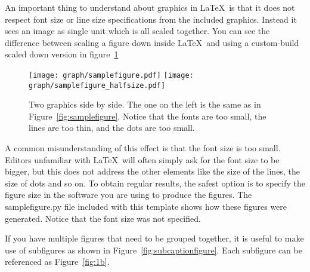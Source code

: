 An important thing to understand about graphics in \LaTeX\ is that it does
not respect font size or line size specifications from the included graphics.
Instead it sees an image as single unit which is all scaled together. You can
see the difference between scaling a figure down inside \LaTeX\ and using a
custom-build scaled down version in figure~\ref{fig:scalingexample}

\begin{figure}[htbp]
  \centering
  \texttt{[image: graph/samplefigure.pdf]}
  \texttt{[image: graph/samplefigure\_halfsize.pdf]}
  \caption{Two graphics side by side. The one on the left is the same as
    in Figure~\ref{fig:samplefigure}. Notice that the fonts are too small,
    the lines are too thin, and the dots are too small.}
  \label{fig:scalingexample}
\end{figure}

A common misunderstanding of this effect is that the font size is too small.
Editors unfamiliar with \LaTeX\ will often simply ask for the font size to be
bigger, but this does not address the other elements like the size of the lines,
the size of dots and so on. To obtain regular results, the safest option is to
specify the figure size in the software you are using to produce the figures.
The samplefigure.py file included with this template shows how these figures
were generated. Notice that the font size was not specified.

If you have multiple figures that need to be grouped together, it is useful to
make use of subfigures as shown in Figure~\ref{fig:subcaptionfigure}. Each
subfigure can be referenced as Figure~\ref{fig:1b}.



